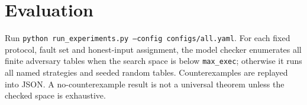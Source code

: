\section{Evaluation}\label{sec:evaluation}
Run \texttt{python run\_experiments.py --config configs/all.yaml}. For each fixed protocol, fault set and honest-input assignment, the model checker enumerates all finite adversary tables when the search space is below \texttt{max\_exec}; otherwise it runs all named strategies and seeded random tables. Counterexamples are replayed into JSON. A no-counterexample result is not a universal theorem unless the checked space is exhaustive.
\begin{table}[h]
\centering

\caption{Observed resilience boundaries from the reproducible finite experiments.}
\end{table}
